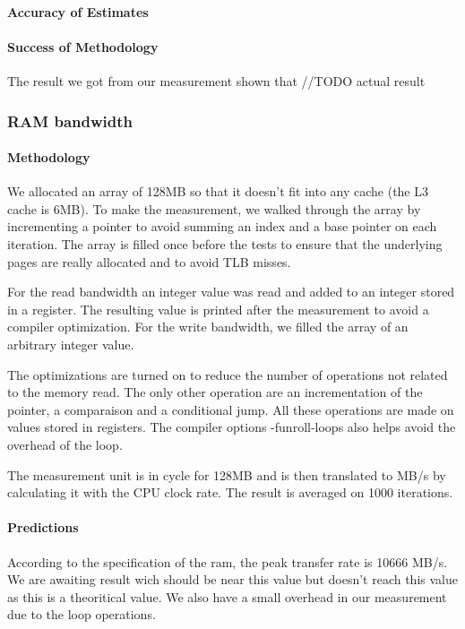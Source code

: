 \paragraph{Accuracy of Estimates}
\paragraph{Success of Methodology}

The result we got from our measurement shown that //TODO actual result




\subsubsection{RAM bandwidth}
\paragraph{Methodology}
We allocated an array of 128MB so that it doesn't fit into any cache (the L3 cache is 6MB).
To make the measurement, we walked through the array by incrementing a pointer to avoid summing an index and a base pointer on each iteration.
The array is filled once before the tests to ensure that the underlying pages are really allocated and to avoid TLB misses.


For the read bandwidth an integer value was read and added to an integer stored in a register.
The resulting value is printed after the measurement to avoid a compiler optimization.
For the write bandwidth, we filled the array of an arbitrary integer value.

The optimizations are turned on to reduce the number of operations not related to the memory read.
The only other operation are an incrementation of the pointer, a comparaison and a conditional jump.
All these operations are made on values stored in registers.
The compiler options -funroll-loops also helps avoid the overhead of the loop.

The measurement unit is in cycle for 128MB and is then translated to MB/s by calculating it with the CPU clock rate.
The result is averaged on 1000 iterations.

\paragraph{Predictions}
According to the specification of the ram, the peak transfer rate is 10666 MB/s.
We are awaiting result wich should be near this value but doesn't reach this value as this is a theoritical value.
We also have a small overhead in our measurement due to the loop operations.

